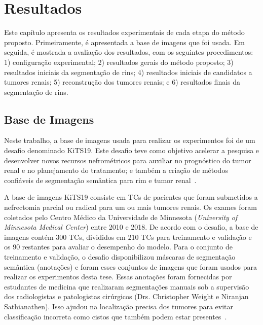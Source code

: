 \chapter{Resultados}
\label{cap:resultados}
\phantom{0}


Este capítulo apresenta os resultados experimentais de cada etapa do método proposto. Primeiramente, é apresentada a base de imagens que foi usada. Em seguida, é mostrada a avaliação dos resultados, com os seguintes procedimentos: 1) configuração experimental; 2) resultados gerais do método proposto; 3) resultados iniciais da segmentação de rins; 4) resultados iniciais de candidatos a tumores renais; 5) reconstrução dos tumores renais; e 6) resultados finais da segmentação de rins. 

\section{Base de Imagens}
\label{sec:conjunto-dados}

Neste trabalho, a base de imagens usada para realizar os experimentos foi de um desafio denominado KiTS19. Este desafio teve como objetivo acelerar a pesquisa e desenvolver novos recursos nefrométricos para auxiliar no prognóstico do tumor renal e no planejamento do tratamento; e também a criação de métodos confiáveis de segmentação semântica para rim e tumor renal~\cite{1904.00445}.

A base de imagens KiTS19 consiste em TCs de pacientes que foram submetidos a nefrectomia parcial ou radical para um ou mais tumores renais. Os exames foram coletados pelo Centro Médico da Universidade de Minnesota (\textit{University of Minnesota Medical Center}) entre 2010 e 2018. De acordo com o desafio, a base de imagens contém 300 TCs, divididos em 210 TCs para treinamento e validação e os 90 restantes para avaliar o desempenho do modelo. Para o conjunto de treinamento e validação, o desafio disponibilizou máscaras de segmentação semântica (anotações) e foram esses conjuntos de imagens que foram usados para realizar os experimentos desta tese. Essas anotações foram fornecidas por estudantes de medicina que realizaram segmentações manuais sob a supervisão dos radiologistas e patologistas cirúrgicos (Drs. Christopher Weight e Niranjan Sathianathen). Isso ajudou na localização precisa dos tumores para evitar classificação incorreta como cistos que também podem estar presentes~\cite{1904.00445}.

